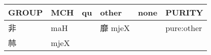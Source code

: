 \documentclass[14pt,a4paper]{scrartcl}
\begin{document}
\begin{longtable}[c]{@{}llllll@{}}
\toprule
\begin{minipage}[b]{0.14\columnwidth}\raggedright\strut
GROUP
\strut\end{minipage} &
\begin{minipage}[b]{0.14\columnwidth}\raggedright\strut
MCH
\strut\end{minipage} &
\begin{minipage}[b]{0.14\columnwidth}\raggedright\strut
qu
\strut\end{minipage} &
\begin{minipage}[b]{0.14\columnwidth}\raggedright\strut
other
\strut\end{minipage} &
\begin{minipage}[b]{0.14\columnwidth}\raggedright\strut
none
\strut\end{minipage} &
\begin{minipage}[b]{0.14\columnwidth}\raggedright\strut
PURITY
\strut\end{minipage}\tabularnewline
\midrule
\endhead
\begin{minipage}[t]{0.14\columnwidth}\raggedright\strut
非
\strut\end{minipage} &
\begin{minipage}[t]{0.14\columnwidth}\raggedright\strut
maH
\strut\end{minipage} &
\begin{minipage}[t]{0.14\columnwidth}\raggedright\strut
\strut\end{minipage} &
\begin{minipage}[t]{0.14\columnwidth}\raggedright\strut
靡 mjeX
\strut\end{minipage} &
\begin{minipage}[t]{0.14\columnwidth}\raggedright\strut
\strut\end{minipage} &
\begin{minipage}[t]{0.14\columnwidth}\raggedright\strut
pure:other
\strut\end{minipage}\tabularnewline
\begin{minipage}[t]{0.14\columnwidth}\raggedright\strut
𣏟
\strut\end{minipage} &
\begin{minipage}[t]{0.14\columnwidth}\raggedright\strut
mjeX
\strut\end{minipage} &
\begin{minipage}[t]{0.14\columnwidth}\raggedright\strut
\strut\end{minipage} &
\begin{minipage}[t]{0.14\columnwidth}\raggedright\strut

\end{minipage}
\end{longtable}
\end{document}
